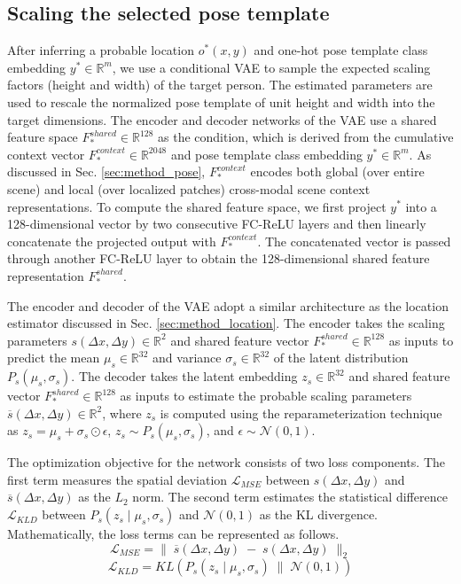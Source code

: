 \subsection{Scaling the selected pose template}
\label{sec:method_scale}
After inferring a probable location $o^*(x, y)$ and one-hot pose template class embedding $y^* \in \mathbb{R}^m$, we use a conditional VAE to sample the expected scaling factors (height and width) of the target person. The estimated parameters are used to rescale the normalized pose template of unit height and width into the target dimensions. The encoder and decoder networks of the VAE use a shared feature space $F^{shared}_* \in \mathbb{R}^{128}$ as the condition, which is derived from the cumulative context vector $F^{context}_* \in \mathbb{R}^{2048}$ and pose template class embedding $y^* \in \mathbb{R}^m$. As discussed in Sec. \ref{sec:method_pose}, $F^{context}_*$ encodes both global (over entire scene) and local (over localized patches) cross-modal scene context representations. To compute the shared feature space, we first project $y^*$ into a 128-dimensional vector by two consecutive FC-ReLU layers and then linearly concatenate the projected output with $F^{context}_*$. The concatenated vector is passed through another FC-ReLU layer to obtain the 128-dimensional shared feature representation $F^{shared}_* $.

The encoder and decoder of the VAE adopt a similar architecture as the location estimator discussed in Sec. \ref{sec:method_location}. The encoder takes the scaling parameters $s(\Delta x, \Delta y) \in \mathbb{R}^2$ and shared feature vector $F^{shared}_* \in \mathbb{R}^{128}$ as inputs to predict the mean $\mu_s \in \mathbb{R}^{32}$ and variance $\sigma_s \in \mathbb{R}^{32}$ of the latent distribution $P_s(\mu_s, \sigma_s)$. The decoder takes the latent embedding $z_s \in \mathbb{R}^{32}$ and shared feature vector $F^{shared}_* \in \mathbb{R}^{128}$ as inputs to estimate the probable scaling parameters $\overline{s}(\Delta x, \Delta y) \in \mathbb{R}^2$, where $z_s$ is computed using the reparameterization technique as $z_s = \mu_s + \sigma_s \odot \epsilon$, $z_s \sim P_s(\mu_s, \sigma_s)$, and $\epsilon \sim \mathcal{N}(0, 1)$.

The optimization objective for the network consists of two loss components. The first term measures the spatial deviation $\mathcal{L}_{MSE}$ between $s(\Delta x, \Delta y)$ and $\overline{s}(\Delta x, \Delta y)$ as the $L_2$ norm. The second term estimates the statistical difference $\mathcal{L}_{KLD}$ between $P_s(z_s \; | \;\mu_s, \sigma_s)$ and $\mathcal{N}(0, 1)$ as the KL divergence. Mathematically, the loss terms can be represented as follows.
\[
\mathcal{L}_{MSE} = \| \; \overline{s}(\Delta x, \Delta y) \; - \; s(\Delta x, \Delta y) \; \|_2
\]
\[
\mathcal{L}_{KLD} = KL \left( P_s(z_s \; | \; \mu_s, \sigma_s) \; \| \; \mathcal{N}(0, 1) \right)
\]

